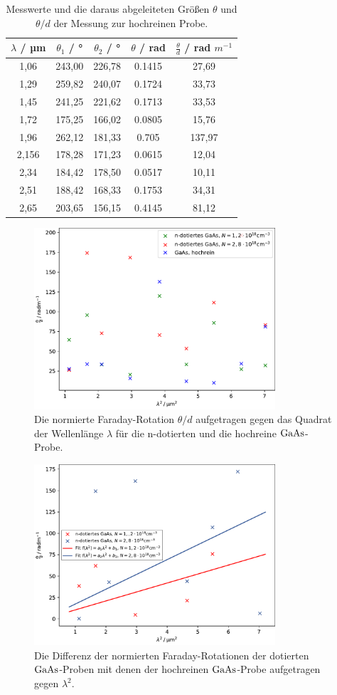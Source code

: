 \begin{table}[h]
  \centering
  \caption{Messwerte und die daraus abgeleiteten Größen $\theta$ und $\theta/d$ der Messung zur hochreinen Probe.}
  \label{tab:probe3}
  \begin{tabular}{S[table-format=1.1] S S S S}
    {$\lambda$ / µm} & {$\theta_1$ / °} & {$\theta_2$ / °} & {$\theta$ / rad} & {$\frac{\theta}{d}$ / rad $m^{-1}$}\\
    ,06 &  243,00 &  226,78 & 0.1415 & 27,69\\
    1,29 &  259,82 &  240,07 & 0.1724 & 33,73\\
    1,45 &  241,25 &  221,62 & 0.1713 & 33,53\\
    1,72 &  175,25 &  166,02 & 0.0805 & 15,76\\
    1,96 &  262,12 &  181,33 & 0.705 & 137,97\\
    2,156 & 178,28 &  171,23 & 0.0615 & 12,04\\
    2,34 & 184,42 &  178,50 & 0.0517 & 10,11\\
    2,51 & 188,42 &  168,33 & 0.1753 & 34,31\\
    2,65 & 203,65 &  156,15 & 0.4145 & 81,12\\
  \end{tabular}
\end{table}
\clearpage
\begin{figure}[H]
  \centering
  \includegraphics[width=0.8\textwidth]{plots/winkel.pdf}
  \caption{Die normierte Faraday-Rotation $\theta/d$ aufgetragen gegen das Quadrat der Wellenlänge $\lambda$ für die n-dotierten und die hochreine $\ce{GaAs}$-Probe.}
  \label{GaAs1}
\end{figure}

\begin{figure}[H]
  \centering
  \includegraphics[width=0.8\textwidth]{plots/linear.pdf}
  \caption{Die Differenz der normierten Faraday-Rotationen der dotierten $\ce{GaAs}$-Proben mit denen der hochreinen $\ce{GaAs}$-Probe aufgetragen gegen $\lambda^2$.}
  \label{GaAs2}
\end{figure}
\clearpage
